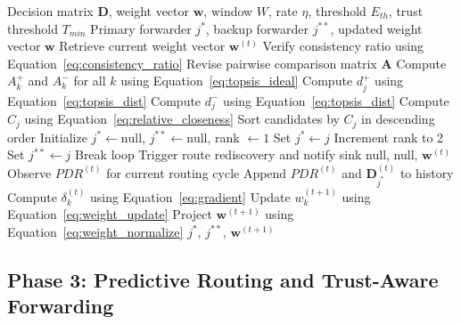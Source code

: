 \documentclass[a4paper,fleqn]{cas-dc}
\numberwithin{equation}{section}
\begin{document}
\begin{algorithm}[htbp]
\small
\caption{Phase 2: TOPSIS Multicriteria Scoring and Online Weight
Adaptation}
\label{alg:phase2}
\begin{algorithmic}[1]
\REQUIRE Decision matrix $\mathbf{D}$, weight vector $\mathbf{w}$,
         window $W$, rate $\eta$,
         threshold $E_{th}$, trust threshold $T_{min}$
\ENSURE Primary forwarder $j^{*}$, backup forwarder $j^{**}$,
        updated weight vector $\mathbf{w}$
\STATE Retrieve current weight vector $\mathbf{w}^{(t)}$
\STATE Verify consistency ratio using Equation~\ref{eq:consistency_ratio}
  \STATE Revise pairwise comparison matrix $\mathbf{A}$
\ENDIF
\STATE Compute $A_k^{+}$ and $A_k^{-}$ for all $k$ using
       Equation~\ref{eq:topsis_ideal}
  \STATE Compute $d_j^{+}$ using Equation~\ref{eq:topsis_dist}
  \STATE Compute $d_j^{-}$ using Equation~\ref{eq:topsis_dist}
  \STATE Compute $C_j$ using Equation~\ref{eq:relative_closeness}
\ENDFOR
\STATE Sort candidates by $C_j$ in descending order
\STATE Initialize $j^{*} \leftarrow \text{null}$,
       $j^{**} \leftarrow \text{null}$, rank $\leftarrow 1$
      \STATE Set $j^{*} \leftarrow j$
      \STATE Increment rank to 2
      \STATE Set $j^{**} \leftarrow j$
      \STATE Break loop
    \ENDIF
  \ENDIF
\ENDFOR
{}
  \STATE Trigger route rediscovery and notify sink
  \RETURN null, null, $\mathbf{w}^{(t)}$
\ENDIF
\STATE Observe $PDR^{(t)}$ for current routing cycle
\STATE Append $PDR^{(t)}$ and $\mathbf{D}_{j^*}^{(t)}$ to history
    \STATE Compute $\delta_k^{(t)}$ using Equation~\ref{eq:gradient}
    \STATE Update $w_k^{(t+1)}$ using Equation~\ref{eq:weight_update}
  \ENDFOR
  \STATE Project $\mathbf{w}^{(t+1)}$ using
         Equation~\ref{eq:weight_normalize}
\ENDIF
\RETURN $j^{*}$, $j^{**}$, $\mathbf{w}^{(t+1)}$
\end{algorithmic}
\end{algorithm}

\subsection{Phase 3: Predictive Routing and Trust-Aware Forwarding}
\label{subsec:phase3}
\end{document}
